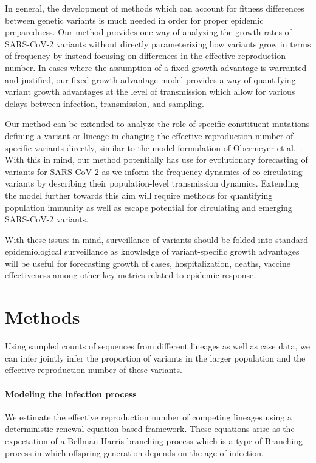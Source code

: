 \documentclass[11pt,oneside,letterpaper]{article}
\begin{document}
In general, the development of methods which can account for fitness differences between genetic variants is much needed in order for proper epidemic preparedness.
Our method provides one way of analyzing the growth rates of SARS-CoV-2 variants without directly parameterizing how variants grow in terms of frequency by instead focusing on differences in the effective reproduction number.
In cases where the assumption of a fixed growth advantage is warranted and justified, our fixed growth advantage model provides a way of quantifying variant growth advantages at the level of transmission which allow for various delays between infection, transmission, and sampling.

Our method can be extended to analyze the role of specific constituent mutations defining a variant or lineage in changing the effective reproduction number of specific variants directly, similar to the model formulation of Obermeyer et al.\ \cite{Obermeyer2021}.
With this in mind, our method potentially has use for evolutionary forecasting of variants for SARS-CoV-2 as we inform the frequency dynamics of co-circulating variants by describing their population-level transmission dynamics.
Extending the model further towards this aim will require methods for quantifying population immunity as well as escape potential for circulating and emerging SARS-CoV-2 variants.

With these issues in mind, surveillance of variants should be folded into standard epidemiological surveillance as knowledge of variant-specific growth advantages will be useful for forecasting growth of cases, hospitalization, deaths, vaccine effectiveness among other key metrics related to epidemic response.

\section*{Methods}

Using sampled counts of sequences from different lineages as well as case data, we can infer jointly infer the proportion of variants in the larger population and the effective reproduction number of these variants.

\paragraph{Modeling the infection process}%

We estimate the effective reproduction number of competing lineages using a deterministic renewal equation based framework. These equations arise as the expectation of a Bellman-Harris branching process \cite{Bellman1948} which is a type of Branching process in which offspring generation depends on the age of infection.
\end{document}
